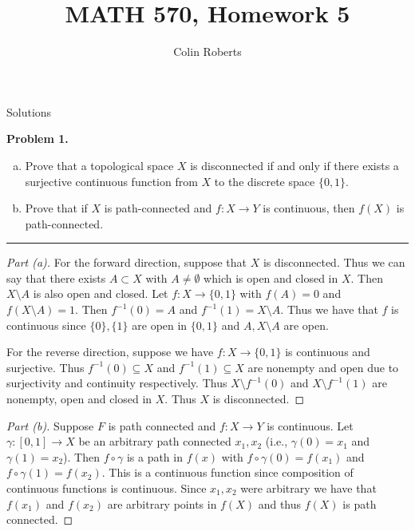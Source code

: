 \documentclass[leqno]{article}
\author{Colin Roberts}
\title{MATH 570, Homework 5}
\theoremstyle{nonumberplain}
\newtheorem{proof}{Proof}
\begin{document}
\maketitle
\begin{large}
\begin{center}
Solutions
\end{center}
\end{large}
\pagebreak


\noindent\textbf{Problem 1.}  
\begin{enumerate}[(a)]
\item Prove that a topological space $X$ is disconnected if and only if there exists a surjective continuous function from $X$ to the discrete space $\{0,1\}$.
\item Prove that if $X$ is path-connected and $f\colon X \to Y $ is continuous, then $f(X)$ is path-connected.
\end{enumerate}

\noindent\rule[0.5ex]{\linewidth}{1pt}

\begin{proof}[Part (a)]
For the forward direction, suppose that $X$ is disconnected. Thus we can say that there exists $A\subset X$ with $A\neq \emptyset$ which is open and closed in $X$. Then $X\setminus A$ is also open and closed. Let $f\colon X\to \{0,1\}$ with $f(A)=0$ and $f(X\setminus A)=1$. Then $f^{-1}(0)=A$ and $f^{-1}(1)=X\setminus A$. Thus we have that $f$ is continuous since $\{0\},\{1\}$ are open in $\{0,1\}$ and $A,X\setminus A$ are open.

For the reverse direction, suppose we have $f\colon X \to \{0,1\}$ is continuous and surjective. Thus $f^{-1}(0)\subseteq X$ and $f^{-1}(1)\subseteq X$ are nonempty and open due to surjectivity and continuity respectively.  Thus $X\setminus f^{-1}(0)$ and $X\setminus f^{-1}(1)$ are nonempty, open and closed in $X$.  Thus $X$ is disconnected.
\end{proof}


\begin{proof}[Part (b)]
Suppose $F$ is path connected and $f\colon X \to Y $ is continuous.  Let $\gamma\colon [0,1]\to X$ be an arbitrary path connected $x_1,x_2$ (i.e., $\gamma(0)=x_1$ and $\gamma(1)=x_2$). Then $f\circ \gamma$ is a path in $f(x)$ with $f\circ \gamma(0)=f(x_1)$ and $f\circ \gamma(1)=f(x_2)$. This is a continuous function since composition of continuous functions is continuous.  Since $x_1,x_2$ were arbitrary we have that $f(x_1)$ and $f(x_2)$ are arbitrary points in $f(X)$ and thus $f(X)$ is path connected.
\end{proof}
\pagebreak
\end{document}
